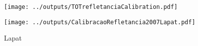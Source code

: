 



\begin{figure}[H]
\begin{center}
  \texttt{[image: ../outputs/TOTrefletanciaCalibration.pdf]}
  \caption{}
\end{center}
\end{figure}
  
\begin{figure}[H]
\begin{center}
  \texttt{[image: ../outputs/CalibracaoRefletancia2007Lapat.pdf]}
  \caption{Lapat }
\end{center}
\end{figure}

\begin{table}[H]
  \centering
  \begin{scriptsize}
    
  \end{scriptsize}
\end{table}

